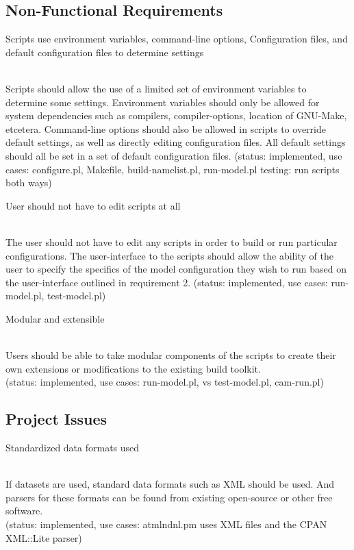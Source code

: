 \documentclass[]{article}
\begin{document}
\begin{enumerate}
\subsection{Non-Functional Requirements}

{\bf\em \item Scripts use environment variables, command-line options, Configuration
files, and default configuration files to determine settings}\\
Scripts should allow the use of a limited set of environment variables
to determine some settings. Environment variables should only be allowed for system
dependencies such as compilers, compiler-options, location of GNU-Make, etcetera. 
Command-line options should also be allowed in scripts to override
default settings, as well as directly editing configuration files. All default settings
should all be set in a set of default configuration files. 
(status: implemented, use cases: configure.pl, Makefile, build-namelist.pl, run-model.pl 
testing: run scripts both ways)

{\bf\em \item User should not have to edit scripts at all}\\
The user should not have to edit any scripts in order to build or run particular configurations.
The user-interface to the scripts should allow the ability of the user to specify
the specifics of the model configuration they wish to run based on the user-interface 
outlined in requirement 2.
(status: implemented, use cases: run-model.pl, test-model.pl)

{\bf\em \item Modular and extensible}\\
Users should be able to take modular components of the scripts to create their own extensions
or modifications to the existing build toolkit. \\
(status: implemented, use cases: run-model.pl, vs test-model.pl, cam-run.pl)

\subsection{Project Issues}

{\bf\em \item Standardized data formats used}\\
If datasets are used, standard data formats such as XML should be used. And parsers for
these formats can be found from existing open-source or other free software.
\\
(status: implemented, use cases: atmlndnl.pm uses XML files and the CPAN XML::Lite parser)


\end{enumerate}
\end{document}
